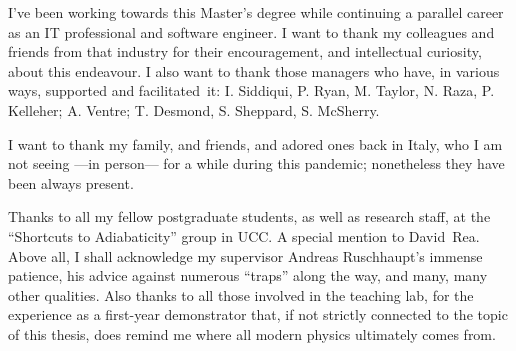 { 
  I've been working towards this Master's degree
  while continuing a parallel career
  as an IT professional and software engineer.
  I want to thank my
  colleagues and friends from that industry for their encouragement,
  and intellectual curiosity,
  about this endeavour.
  I also want to thank those managers
  who have, in various ways, supported and facilitated~it:
  I. Siddiqui, P. Ryan, M. Taylor, N. Raza, P. Kelleher;
  A. Ventre;
  T. Desmond, S. Sheppard, S. McSherry.

  I want to thank my family, and friends, and adored ones back in Italy,
  who I am not seeing ---in person--- for a while during this pandemic;
  nonetheless they have been always present.

  Thanks to all my fellow postgraduate students,
  as well as research staff,
  at the ``Shortcuts to Adiabaticity'' group in UCC.
  A special mention to David~Rea.
  Above all, I shall acknowledge my supervisor Andreas Ruschhaupt's immense patience,
  his advice against numerous ``traps'' along the way, and many, many other qualities.
  Also thanks to all those involved in the teaching lab, for the experience as a
  first-year demonstrator that,
  if not strictly connected to the topic of this thesis,
  does remind me where all modern physics ultimately comes from.
}
